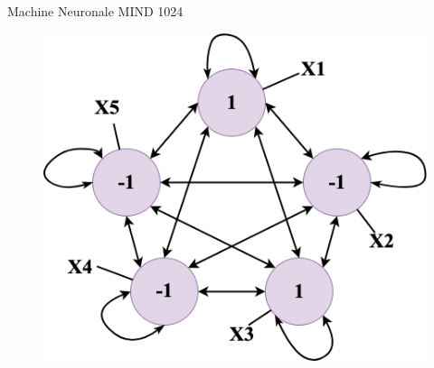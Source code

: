 \documentclass{beamer}
\begin{document}
\begin{frame}{Machine Neuronale MIND 1024}
    \begin{figure}
        \centering
        \includegraphics[width=0.5\linewidth]{pic/network1.png}
    \end{figure}
\end{frame}
\end{document}
